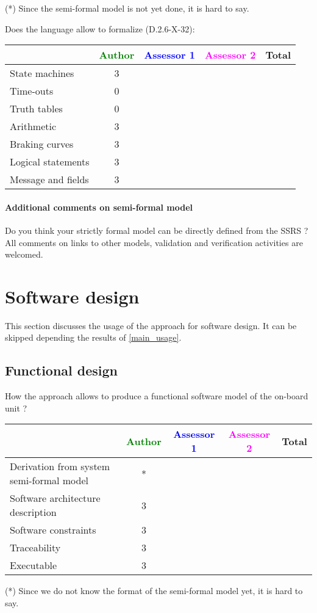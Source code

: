 \begin{author_comment}
(*) Since the semi-formal model is not yet done, it is hard to say.
\end{author_comment}
Does the language allow to  formalize (D.2.6-X-32):

\begin{tabular}{|l | c | c | c | c|}
\hline
& \textcolor{green}{Author} & \textcolor{blue}{Assessor 1} & \textcolor{magenta}{Assessor 2} & Total \\
\hline 
State machines  &3 & & &  \\
\hline
Time-outs  &0 & & &  \\
\hline
Truth tables  &0 & & &  \\
\hline
Arithmetic  &3 & & &  \\
\hline
Braking curves  &3 & & &  \\
\hline
Logical statements &3 & & &  \\
\hline
Message and fields &3 & & &  \\
\hline
\end{tabular}

\paragraph{Additional comments on semi-formal  model} Do you think your strictly formal  model can be directly defined from the SSRS ?
All comments on links to  other models, validation and verification activities are welcomed.


\section{Software design}
This section discusses the usage of the approach for software design.
It can be skipped depending the results of \ref{main_usage}.

\subsection{Functional design}

How the approach allows to  produce a functional software model of the on-board unit ?

\begin{tabular}{|l | c | c | c | c|}
\hline
& \textcolor{green}{Author} & \textcolor{blue}{Assessor 1} & \textcolor{magenta}{Assessor 2} & Total \\
\hline
Derivation from system semi-formal model  &* & & &  \\
\hline 
Software architecture description  &3 & & &  \\
\hline
Software constraints  &3 & & &  \\
\hline
Traceability  &3 & & &  \\
\hline
Executable  &3 & & &  \\
\hline
\end{tabular}
\begin{author_comment}
(*) Since we do not know the format of the semi-formal model  yet, it is hard to say.
\end{author_comment}

